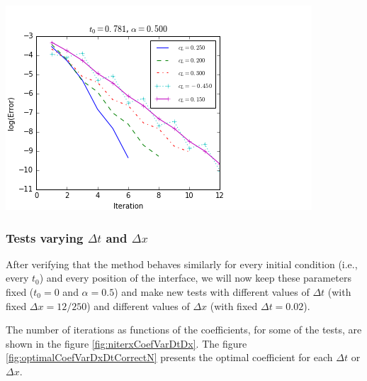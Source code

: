 \begingroup
\begin{center}
\includegraphics[scale=.5]{figures/errorEvolutionFixedT0BNegativeCoefCorrectN.png}
\end{center}
\endgroup

\subsubsection{Tests varying $\Delta t$ and $\Delta x$}

\indent After verifying that the method behaves similarly for every initial condition (i.e., every $t_0$) and every position of the interface, we will now keep these parameters fixed ($t_0 = 0$ and $\alpha = 0.5$) and make new tests with different values of $\Delta t$ (with fixed $\Delta x = 12/250$) and different values of $\Delta x$ (with fixed $\Delta t = 0.02$).

\indent The number of iterations as functions of the coefficients, for some of the tests, are shown in the figure \ref{fig:niterxCoefVarDtDx}. The figure \ref{fig:optimalCoefVarDxDtCorrectN} presents the optimal coefficient for each $\Delta t$ or $\Delta x$. 

